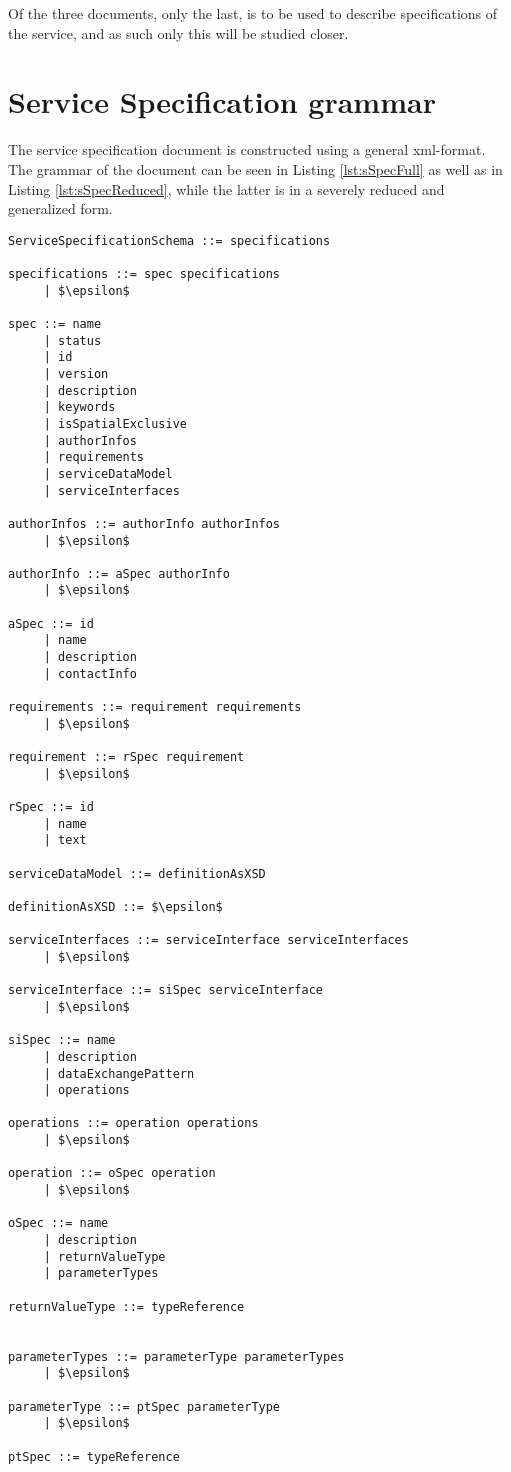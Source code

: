 Of the three documents, only the last,  is to be used to describe specifications of the service, and as such only this will be studied closer.
\section{Service Specification grammar}
The service specification document is constructed using a general xml-format. The grammar of the document can be seen in Listing \ref{lst:sSpecFull} as well as in Listing \ref{lst:sSpecReduced}, while the latter is in a severely reduced and generalized form.
\begin{lstlisting}[mathescape=true, keywordstyle={},label={lst:sSpecFull},caption={Full parser grammar of Service Specification Schema},captionpos={below}]
ServiceSpecificationSchema ::= specifications

specifications ::= spec specifications
     | $\epsilon$
     
spec ::= name
     | status
     | id
     | version
     | description
     | keywords
     | isSpatialExclusive
     | authorInfos
     | requirements
     | serviceDataModel
     | serviceInterfaces
     
authorInfos ::= authorInfo authorInfos
     | $\epsilon$

authorInfo ::= aSpec authorInfo
     | $\epsilon$

aSpec ::= id
     | name
     | description
     | contactInfo

requirements ::= requirement requirements
     | $\epsilon$

requirement ::= rSpec requirement
     | $\epsilon$

rSpec ::= id
     | name
     | text

serviceDataModel ::= definitionAsXSD

definitionAsXSD ::= $\epsilon$

serviceInterfaces ::= serviceInterface serviceInterfaces
     | $\epsilon$

serviceInterface ::= siSpec serviceInterface
     | $\epsilon$

siSpec ::= name
     | description
     | dataExchangePattern
     | operations

operations ::= operation operations
     | $\epsilon$

operation ::= oSpec operation
     | $\epsilon$

oSpec ::= name
     | description
     | returnValueType
     | parameterTypes

returnValueType ::= typeReference


parameterTypes ::= parameterType parameterTypes
     | $\epsilon$

parameterType ::= ptSpec parameterType
     | $\epsilon$

ptSpec ::= typeReference
\end{lstlisting}

